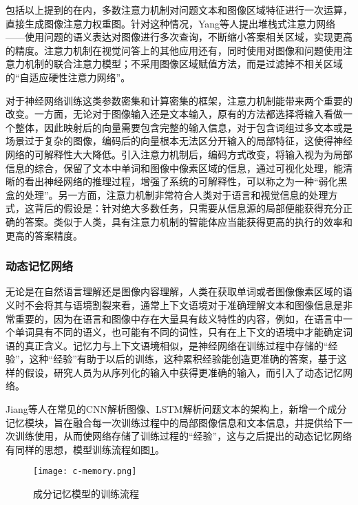 包括以上提到的在内，多数注意力机制对问题文本和图像区域特征进行一次运算，直接生成图像注意力权重图。针对这种情况，Yang等人提出堆栈式注意力网络——使用问题的语义表达对图像进行多次查询，不断缩小答案相关区域，实现更高的精度。注意力机制在视觉问答上的其他应用还有，同时使用对图像和问题使用注意力机制的联合注意力模型；不采用图像区域赋值方法，而是过滤掉不相关区域的“自适应硬性注意力网络”。

对于神经网络训练这类参数密集和计算密集的框架，注意力机制能带来两个重要的改变。一方面，无论对于图像输入还是文本输入，原有的方法都选择将输入看做一个整体，因此映射后的向量需要包含完整的输入信息，对于包含词组过多文本或是场景过于复杂的图像，编码后的向量根本无法区分开输入的局部特征，这使得神经网络的可解释性大大降低。引入注意力机制后，编码方式改变，将输入视为为局部信息的综合，保留了文本中单词和图像中像素区域的信息，通过可视化处理，能清晰的看出神经网络的推理过程，增强了系统的可解释性，可以称之为一种“弱化黑盒的处理”。另一方面，注意力机制非常符合人类对于语言和视觉信息的处理方式，这背后的假设是：针对绝大多数任务，只需要从信息源的局部便能获得充分正确的答案。类似于人类，具有注意力机制的智能体应当能获得更高的执行的效率和更高的答案精度。

\subsubsection{动态记忆网络}
无论是在自然语言理解还是图像内容理解，人类在获取单词或者图像像素区域的语义时不会将其与语境割裂来看，通常上下文语境对于准确理解文本和图像信息是非常重要的，因为在语言和图像中存在大量具有歧义特性的内容，例如，在语言中一个单词具有不同的语义，也可能有不同的词性，只有在上下文的语境中才能确定词语的真正含义。记忆力与上下文语境相似，是神经网络在训练过程中存储的“经验”，这种“经验”有助于以后的训练，这种累积经验能创造更准确的答案，基于这样的假设，研究人员为从序列化的输入中获得更准确的输入，而引入了动态记忆网络。

Jiang等人在常见的CNN解析图像、LSTM解析问题文本的架构上，新增一个成分记忆模块，旨在融合每一次训练过程中的局部图像信息和文本信息，并提供给下一次训练使用，从而使网络存储了训练过程的“经验”，这与之后提出的动态记忆网络有同样的思想，模型训练流程如图\ref{c-memory}。
\begin{figure}[H]
	\centering
	\texttt{[image: c-memory.png]}
	\caption{成分记忆模型的训练流程}
	\label{c-memory}
\end{figure}

